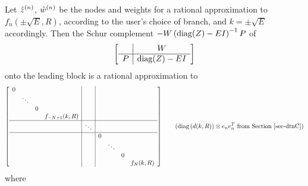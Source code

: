Let $\hat{z}^{(n)}$, $\hat{w}^{(n)}$ be the nodes and
weights for a rational approximation to $f_n(\pm\sqrt{E},R)$,
according to the user's choice
of branch, and $k = \pm\sqrt{E}$ accordingly. 
Then the Schur complement 
$-W\left(\operatorname{diag}(Z) - E I\right)^{-1} P$ of
\begin{align*}
 \left[
 \begin{array}{c|c}
    & W \\ \hline
  P & \operatorname{diag}(Z) - E I
 \end{array}
 \right]
\end{align*}
onto the leading block
is a rational approximation to
\begin{align*}
 \left[
 \begin{array}{cccc|c|cccc}
  0 &        &   &               &        &   &        &   & \\
    & \ddots &   &               &        &   &        &   & \\
    &        & 0 &               &        &   &        &   & \\
    &        &   & f_{-N+1}(k,R) &        &   &        &   & \\ \hline
    &        &   &               & \ddots &   &        &   & \\ \hline
    &        &   &               &        & 0 &        &   & \\
    &        &   &               &        &   & \ddots &   & \\ 
    &        &   &               &        &   &        & 0 & \\ 
    &        &   &               &        &   &        &   & f_N(k,R)
 \end{array}
 \right]
 \qquad
 (\operatorname{diag}\left(d(k,R)\right) \otimes e_ne_n^T \text{ from Section~\ref{sec-dtnC}})
\end{align*}
where
